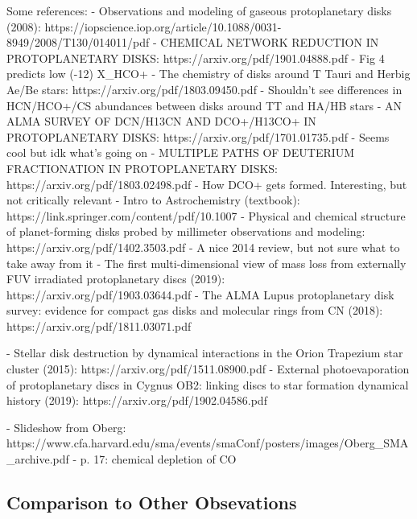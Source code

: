 Some references:
- Observations and modeling of gaseous protoplanetary disks (2008): https://iopscience.iop.org/article/10.1088/0031-8949/2008/T130/014011/pdf
- CHEMICAL NETWORK REDUCTION IN PROTOPLANETARY DISKS: https://arxiv.org/pdf/1901.04888.pdf
    - Fig 4 predicts low (-12) X_HCO+
- The chemistry of disks around T Tauri and Herbig Ae/Be stars: https://arxiv.org/pdf/1803.09450.pdf
    - Shouldn't see differences in HCN/HCO+/CS abundances between disks around TT and HA/HB stars
- AN ALMA SURVEY OF DCN/H13CN AND DCO+/H13CO+ IN PROTOPLANETARY DISKS: https://arxiv.org/pdf/1701.01735.pdf
    - Seems cool but idk what's going on
- MULTIPLE PATHS OF DEUTERIUM FRACTIONATION IN PROTOPLANETARY DISKS: https://arxiv.org/pdf/1803.02498.pdf
    - How DCO+ gets formed. Interesting, but not critically relevant
- Intro to Astrochemistry (textbook): https://link.springer.com/content/pdf/10.1007%
- Physical and chemical structure of planet-forming disks probed by millimeter observations and modeling: https://arxiv.org/pdf/1402.3503.pdf
    - A nice 2014 review, but not sure what to take away from it
- The first multi-dimensional view of mass loss from externally FUV irradiated protoplanetary discs (2019): https://arxiv.org/pdf/1903.03644.pdf
- The ALMA Lupus protoplanetary disk survey: evidence for compact gas disks and molecular rings from CN (2018): https://arxiv.org/pdf/1811.03071.pdf


- Stellar disk destruction by dynamical interactions in the Orion Trapezium star cluster (2015): https://arxiv.org/pdf/1511.08900.pdf
- External photoevaporation of protoplanetary discs in Cygnus OB2: linking discs to star formation dynamical history (2019): https://arxiv.org/pdf/1902.04586.pdf

- Slideshow from Oberg: https://www.cfa.harvard.edu/sma/events/smaConf/posters/images/Oberg_SMA_archive.pdf
  - p. 17: chemical depletion of CO


\subsection{Comparison to Other Obsevations}



